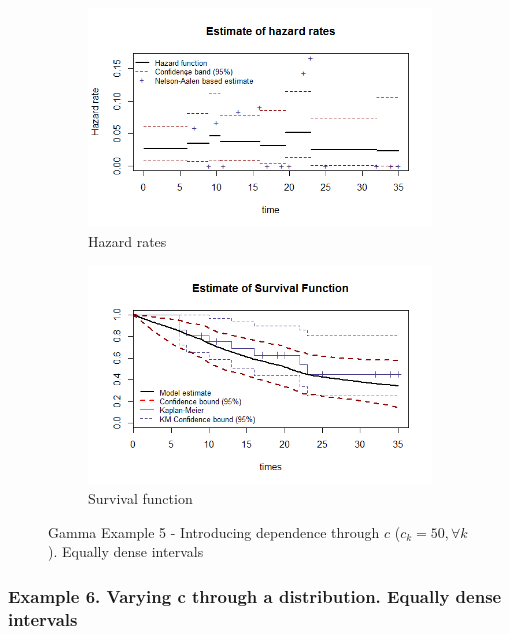 \documentclass[letterpaper]{article}\usepackage[]{graphicx}\usepackage[]{color}
\begin{document}
\begin{figure}
  \centering
  \begin{subfigure}[a]{\textwidth}\centering
    \includegraphics[width=\textwidth]{G51.png}
    \caption{Hazard rates}
  \end{subfigure}
  \begin{subfigure}[b]{\textwidth}\centering
    \includegraphics[width=\textwidth]{G52.png}
    \caption{Survival function}
  \end{subfigure}
  \caption{Gamma Example 5 - Introducing dependence through $c$ ($c_k=50, \forall k$). Equally dense intervals}
  \label{fig:G5}
\end{figure}

\subsubsection{Example 6. Varying c through a distribution. Equally dense intervals}
\end{document}
